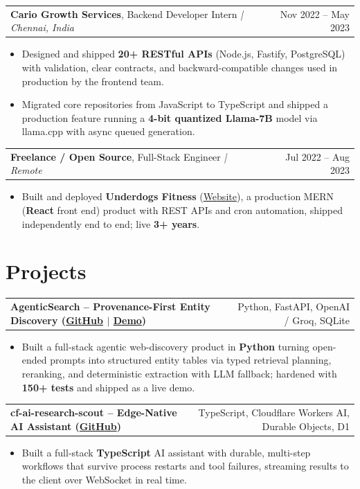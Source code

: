 \documentclass[letterpaper,11pt]{article}
\makeatletter
\newcommand{\expItem}[4]{%
  \vspace{3pt}
  \begin{tabular*}{\textwidth}{@{}l@{\extracolsep{\fill}}r@{}}
    \textbf{#1}, #2 \textit{| #3} & #4 \\
  \end{tabular*}\par\vspace{-2pt}
}
\newcommand{\projItem}[2]{%
  \vspace{6pt}
  \begin{tabular*}{\textwidth}{@{}l@{\extracolsep{\fill}}r@{}}
    \textbf{#1} & #2 \\
  \end{tabular*}\par\vspace{-2pt}
}
\makeatother
\begin{document}
\expItem{Cario Growth Services}{Backend Developer Intern}{Chennai, India}{Nov 2022 -- May 2023}
\begin{itemize}
  \item Designed and shipped \textbf{20+ RESTful APIs} (Node.js, Fastify, PostgreSQL) with validation, clear contracts, and backward-compatible changes used in production by the frontend team.
  \item Migrated core repositories from JavaScript to TypeScript and shipped a production feature running a \textbf{4-bit quantized Llama-7B} model via llama.cpp with async queued generation.
\end{itemize}

\expItem{Freelance / Open Source}{Full-Stack Engineer}{Remote}{Jul 2022 -- Aug 2023}
\begin{itemize}
  \item Built and deployed \textbf{Underdogs Fitness} (\href{https://www.underdogsfitness.in/}{Website}), a production MERN (\textbf{React} front end) product with REST APIs and cron automation, shipped independently end to end; live \textbf{3+ years}.
\end{itemize}

\section{Projects}

\projItem{AgenticSearch -- Provenance-First Entity Discovery {\normalfont\small(\href{https://github.com/Deva-1903/ciir_agentic_search}{GitHub} $\vert$ \href{https://agentic-search-negglszkwa-uc.a.run.app}{Demo})}}{Python, FastAPI, OpenAI / Groq, SQLite}
\begin{itemize}
  \item Built a full-stack agentic web-discovery product in \textbf{Python} turning open-ended prompts into structured entity tables via typed retrieval planning, reranking, and deterministic extraction with LLM fallback; hardened with \textbf{150+ tests} and shipped as a live demo.
\end{itemize}

\projItem{cf-ai-research-scout -- Edge-Native AI Assistant {\normalfont\small(\href{https://github.com/Deva-1903/cf_ai_research_scout}{GitHub})}}{TypeScript, Cloudflare Workers AI, Durable Objects, D1}
\begin{itemize}
  \item Built a full-stack \textbf{TypeScript} AI assistant with durable, multi-step workflows that survive process restarts and tool failures, streaming results to the client over WebSocket in real time.
\end{itemize}
\end{document}
